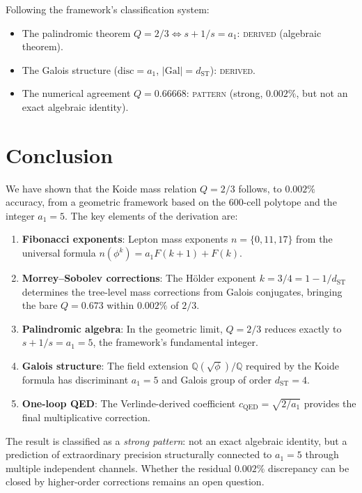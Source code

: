 \documentclass[12pt,a4paper]{article}
\theoremstyle{definition}
\begin{document}
Following the framework's classification system:
\begin{itemize}
\item The palindromic theorem $Q = 2/3 \Leftrightarrow s + 1/s = a_1$: \textsc{derived} (algebraic theorem).
\item The Galois structure ($\mathrm{disc} = a_1$, $|\mathrm{Gal}| = d_{\mathrm{ST}}$): \textsc{derived}.
\item The numerical agreement $Q = 0.66668$: \textsc{pattern} (strong, $0.002\%$, but not an exact algebraic identity).
\end{itemize}

\section{Conclusion}
\label{sec:conclusion}

We have shown that the Koide mass relation $Q = 2/3$ follows, to $0.002\%$ accuracy, from a geometric framework based on the 600-cell polytope and the integer $a_1 = 5$.  The key elements of the derivation are:

\begin{enumerate}
\item \textbf{Fibonacci exponents}: Lepton mass exponents $n = \{0, 11, 17\}$ from the universal formula $n(\phi^k) = a_1 F(k+1) + F(k)$.
\item \textbf{Morrey--Sobolev corrections}: The H\"older exponent $k = 3/4 = 1 - 1/d_{\mathrm{ST}}$ determines the tree-level mass corrections from Galois conjugates, bringing the bare $Q = 0.673$ within $0.002\%$ of $2/3$.
\item \textbf{Palindromic algebra}: In the geometric limit, $Q = 2/3$ reduces exactly to $s + 1/s = a_1 = 5$, the framework's fundamental integer.
\item \textbf{Galois structure}: The field extension $\mathbb{Q}(\sqrt{\phi})/\mathbb{Q}$ required by the Koide formula has discriminant $a_1 = 5$ and Galois group of order $d_{\mathrm{ST}} = 4$.
\item \textbf{One-loop QED}: The Verlinde-derived coefficient $c_{\mathrm{QED}} = \sqrt{2/a_1}$ provides the final multiplicative correction.
\end{enumerate}

The result is classified as a \emph{strong pattern}: not an exact algebraic identity, but a prediction of extraordinary precision structurally connected to $a_1 = 5$ through multiple independent channels.  Whether the residual $0.002\%$ discrepancy can be closed by higher-order corrections remains an open question.
\end{document}
